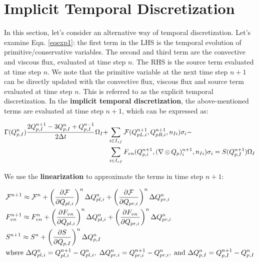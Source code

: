\documentclass[12pt, letterpaper]{report}
\begin{document}
\clearpage
\section{Implicit Temporal Discretization}

In this section, let's consider an alternative way of temporal discretization. Let's examine Eqn.
\ref{eqexp1}: the first term in the LHS is the temporal evolution of primitive/conservative
variables. The second and third term are the convective and viscous flux, evaluated at time step
$n$. The RHS is the source term evaluated at time step $n$. We note that the primitive variable at
the next time step $n+1$ can be directly updated with the convective flux, viscous flux and source
term evaluated at time step $n$. This is referred to as the explicit temporal discretization. In the
{\bf implicit temporal discretization}, the above-mentioned terms are evaluated at time step $n+1$,
which can be expressed as:

\begin{align}\label{eqimpExpand}
   \begin{split}
      \Gamma(Q_{p,I}^n) \frac{2Q_{p,I}^{n+1} - 3Q_{p,I}^n + Q_{p,I}^{n-1}}{2\Delta t} \Omega_I +
      &\sum_{i \in I_{sf}} \mathcal{F}(Q_{pL,i}^{n+1}, Q_{pR,i}^{n+1}, n_{Ii}) \sigma_i - \\ &\sum_{i \in
      I_{sf}} F_{vn}(Q_{p,i}^{n+1}, (\nabla \mathop{\otimes} Q_p)_i^{n+1}, n_{Ii}) \sigma_i =
      S(Q_{p,I}^{n+1})
      \Omega_I
   \end{split}
\end{align}

We use the {\bf linearization} to approximate the terms in time step $n+1$:

\begin{align}\label{eqlinapp}
   \begin{split}
      &\mathcal{F}^{n+1} \approx \mathcal{F}^n + \left(\frac{\partial \mathcal{F}}{\partial
      Q_{pl,i}}\right)^n \Delta Q_{pl,i}^n + \left(\frac{\partial \mathcal{F}}{\partial Q_{pr,i}}\right)^n \Delta
      Q_{pr,i}^n \\ & F_{vn}^{n+1} \approx F_{vn}^n + \left(\frac{\partial F_{vn}}{\partial
      Q_{pl,i}}\right)^n \Delta Q_{pl,i}^n +
      \left(\frac{\partial F_{vn}}{\partial Q_{pr,i}}\right)^n \Delta Q_{pr,i}^n \\ & S^{n+1}
      \approx S^n + \left(\frac{\partial S}{\partial Q_{p,I}}\right)^n \Delta Q_{p,I}^n
      \\ &\textrm{where } \Delta Q_{pl,i}^n = Q_{pl,i}^{n+1} - Q_{pl,i}^n, \; \Delta Q_{pr,i}^n =
      Q_{pr,i}^{n+1} - Q_{pr,i}^n, \; \textrm{and } \Delta Q_{p,I}^n = Q_{p,I}^{n+1} - Q_{p,I}^n
   \end{split}
\end{align}
\end{document}
